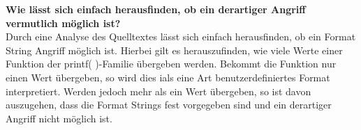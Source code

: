 \documentclass[12pt,a4paper]{article}
\begin{document}
	\textbf{Wie lässt sich einfach herausfinden, ob ein derartiger Angriff vermutlich möglich ist?} \\
	Durch eine Analyse des Quelltextes lässt sich einfach herausfinden, ob ein Format String Angriff möglich ist. Hierbei gilt es herauszufinden, wie viele Werte einer Funktion der printf( )-Familie übergeben werden. Bekommt die Funktion nur einen Wert übergeben, so wird dies ials eine Art benutzerdefiniertes Format interpretiert. Werden jedoch mehr als ein Wert übergeben, so ist davon auszugehen, dass die Format Strings fest vorgegeben sind und ein derartiger Angriff nicht möglich ist. 
	\bigskip
	
	
\end{document}

